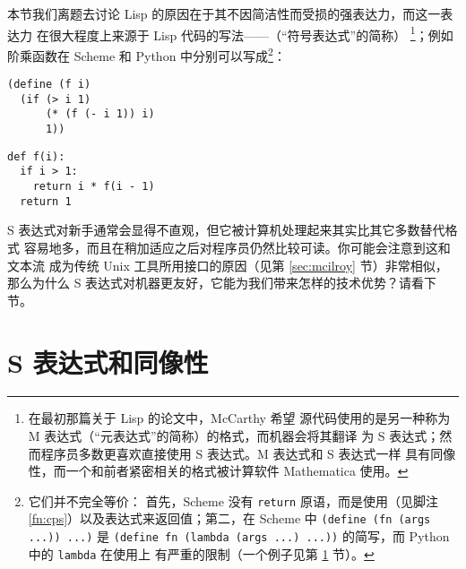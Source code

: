 本节我们离题去讨论 Lisp 的原因在于其不因简洁性而受损的强表达力，而这一表达力
在很大程度上来源于 Lisp 代码的写法——（“符号表达式”的简称）%
\footnote{在最初那篇关于 Lisp 的论文中，McCarthy 希望
源代码使用的是另一种称为 M 表达式（“元表达式”的简称）的格式，而机器会将其翻译
为 S 表达式；然而程序员多数更喜欢直接使用 S 表达式。M 表达式和 S 表达式一样
具有同像性，而一个和前者紧密相关的格式被计算软件 Mathematica 使用。}；例如
阶乘函数在 Scheme 和 Python 中分别可以写成\footnote{它们并不完全等价：
首先，Scheme 没有 \texttt{return} 原语，而是使用（见脚注
\ref{fn:cps}）以及表达式来返回值；第二，在 Scheme 中
\texttt{(define (fn (args ...)) ...)} 是 \texttt{(define fn (lambda
(args ...) ...))} 的简写，而 Python 中的 \texttt{lambda} 在使用上
有严重的限制（一个例子见第 \ref{sec:homoiconic} 节）。}：
\colskipa\begin{multicols}{2}
\begin{quoting}
\begin{Verbatim}
(define (f i)
  (if (> i 1)
      (* (f (- i 1)) i)
      1))
\end{Verbatim}
\end{quoting}
\begin{quoting}
\begin{Verbatim}
def f(i):
  if i > 1:
    return i * f(i - 1)
  return 1
\end{Verbatim}
\end{quoting}
\end{multicols}\colskipb\noindent%
S 表达式对新手通常会显得不直观，但它被计算机处理起来其实比其它多数替代格式
容易地多，而且在稍加适应之后对程序员仍然比较可读。你可能会注意到这和文本流
成为传统 Unix 工具所用接口的原因（见第 \ref{sec:mcilroy} 节）非常相似，
那么为什么 S 表达式对机器更友好，它能为我们带来怎样的技术优势？请看下节。

\newpart
\section{S 表达式和同像性}\label{sec:homoiconic}


